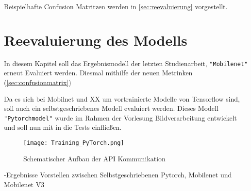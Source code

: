 Beispielhafte Confusion Matritzen werden in \autoref{sec:reevaluierung} vorgestellt.

\section{Reevaluierung des Modells} \label{sec:reevaluierung}

In diesem Kapitel soll das Ergebnismodell der letzten Studienarbeit, \texttt{"Mobilenet"} erneut Evaluiert werden. Diesmal mithilfe der neuen Metrinken (\autoref{sec:confusionmatrix})

Da es sich bei Mobilnet und XX um vortrainierte Modelle von Tensorflow sind, soll auch ein selbstgeschriebenes Modell evaluiert werden. Dieses Modell \texttt{"Pytorchmodel"} wurde im Rahmen der Vorlesung Bildverarbeitung entwickelt und soll nun mit in die Tests einfließen. 

\begin{figure}[h]
    \centering
    \texttt{[image: Training\_PyTorch.png]}
    \caption{Schematischer Aufbau der API Kommunikation}
    \label{fig:Training_PyTorch}
\end{figure}

-Ergebnisse Vorstellen zwischen Selbstgeschriebenen Pytorch, Mobilenet und Mobilenet V3